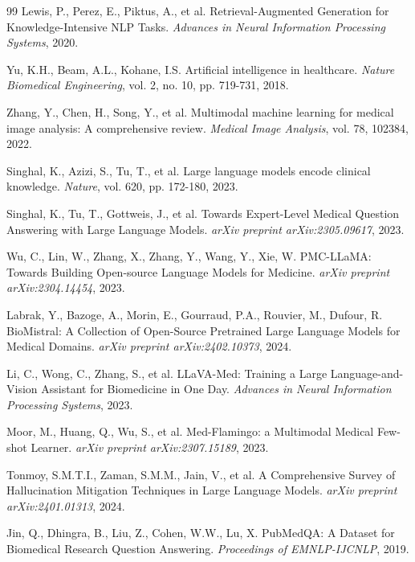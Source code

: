 \begin{thebibliography}{99}
         Lewis, P., Perez, E., Piktus, A., et al. Retrieval-Augmented Generation for Knowledge-Intensive NLP Tasks. \textit{Advances in Neural Information Processing Systems}, 2020.
        
         Yu, K.H., Beam, A.L., Kohane, I.S. Artificial intelligence in healthcare. \textit{Nature Biomedical Engineering}, vol. 2, no. 10, pp. 719-731, 2018.
        
         Zhang, Y., Chen, H., Song, Y., et al. Multimodal machine learning for medical image analysis: A comprehensive review. \textit{Medical Image Analysis}, vol. 78, 102384, 2022.
        
         Singhal, K., Azizi, S., Tu, T., et al. Large language models encode clinical knowledge. \textit{Nature}, vol. 620, pp. 172-180, 2023.

         Singhal, K., Tu, T., Gottweis, J., et al. Towards Expert-Level Medical Question Answering with Large Language Models. \textit{arXiv preprint arXiv:2305.09617}, 2023.

         Wu, C., Lin, W., Zhang, X., Zhang, Y., Wang, Y., Xie, W. PMC-LLaMA: Towards Building Open-source Language Models for Medicine. \textit{arXiv preprint arXiv:2304.14454}, 2023.

         Labrak, Y., Bazoge, A., Morin, E., Gourraud, P.A., Rouvier, M., Dufour, R. BioMistral: A Collection of Open-Source Pretrained Large Language Models for Medical Domains. \textit{arXiv preprint arXiv:2402.10373}, 2024.

         Li, C., Wong, C., Zhang, S., et al. LLaVA-Med: Training a Large Language-and-Vision Assistant for Biomedicine in One Day. \textit{Advances in Neural Information Processing Systems}, 2023.

         Moor, M., Huang, Q., Wu, S., et al. Med-Flamingo: a Multimodal Medical Few-shot Learner. \textit{arXiv preprint arXiv:2307.15189}, 2023.

         Tonmoy, S.M.T.I., Zaman, S.M.M., Jain, V., et al. A Comprehensive Survey of Hallucination Mitigation Techniques in Large Language Models. \textit{arXiv preprint arXiv:2401.01313}, 2024.

         Jin, Q., Dhingra, B., Liu, Z., Cohen, W.W., Lu, X. PubMedQA: A Dataset for Biomedical Research Question Answering. \textit{Proceedings of EMNLP-IJCNLP}, 2019.


\end{thebibliography}
